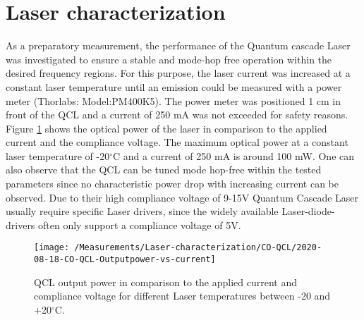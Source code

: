 \section{Laser characterization}
As a preparatory measurement, the performance of the Quantum cascade Laser was investigated to ensure a stable and mode-hop free operation within the desired frequency regions. For this purpose, the laser current was increased at a constant laser temperature until an emission could be measured with a power meter (Thorlabs: Model:PM400K5). The power meter was positioned 1 cm in front of the QCL and a current of 250 mA was not exceeded for safety reasons. Figure \ref{fig:co-qcl-outputpower} shows the optical power of the laser in comparison to the applied current and the compliance voltage. The maximum optical power at a constant laser temperature of -20$^\circ$C and a current of 250 mA is around 100 mW. One can also observe that the QCL can be tuned mode hop-free within the tested parameters since no characteristic power drop with increasing current can be observed. Due to their high compliance voltage of 9-15V Quantum Cascade Laser usually require specific Laser drivers, since the widely available Laser-diode-drivers often only support a compliance voltage of 5V.
\begin{figure}[H]
	\centering
	\texttt{[image: /Measurements/Laser-characterization/CO-QCL/2020-08-18-CO-QCL-Outputpower-vs-current]}
	\caption{QCL output power in comparison to the applied current and compliance voltage for different Laser temperatures between -20 and +20$^{\circ}$C.}
	\label{fig:co-qcl-outputpower}
\end{figure}

